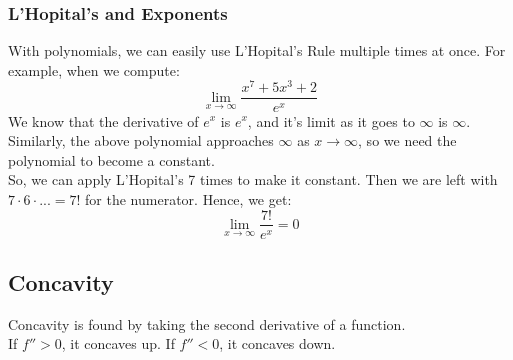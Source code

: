 \documentclass{article}
\begin{document}
\subsubsection{L'Hopital's and Exponents}
With polynomials, we can easily use L'Hopital's Rule multiple times at once. For example, when we compute:
$$\lim_{x\to \infty} \frac{x^7 + 5x^3 + 2}{e^x}$$
We know that the derivative of $e^x$ is $e^x$, and it's limit as it goes to $\infty$ is $\infty$. Similarly, the above polynomial approaches $\infty$ as $x \to \infty$, so we need the polynomial to become a constant.\\
So, we can apply L'Hopital's 7 times to make it constant. Then we are left with $7 \cdot 6 \cdot ... = 7!$ for the numerator. Hence, we get:
$$\lim_{x \to \infty} \frac{7!}{e^x} = 0$$

\subsection{Concavity}
Concavity is found by taking the second derivative of a function.\\
If $f'' > 0$, it concaves up. If $f'' < 0$, it concaves down.
\end{document}
